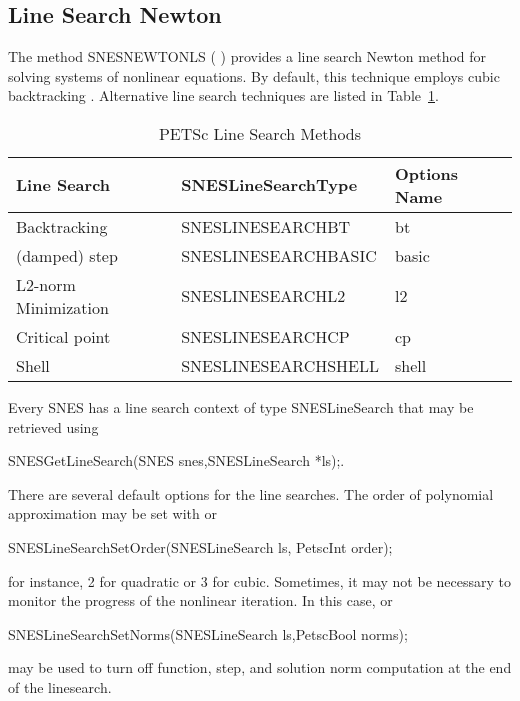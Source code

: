 \subsection{Line Search Newton} 

The method SNESNEWTONLS ( ) provides a line search Newton method for solving systems of
nonlinear equations.  By default, this technique employs cubic backtracking \cite{dennis:83}.  Alternative line search
techniques are listed in Table~\ref{tab_linesearches}.

\begin{table}
\begin{center}
\begin{tabular}{lll}
{\bf Line Search}      &{\bf SNESLineSearchType}& {\bf Options Name} \\
\hline
Backtracking           & SNESLINESEARCHBT       & bt                 \\
(damped) step          & SNESLINESEARCHBASIC    & basic              \\
L2-norm  Minimization  & SNESLINESEARCHL2       & l2                 \\
Critical point         & SNESLINESEARCHCP       & cp                 \\
Shell                  & SNESLINESEARCHSHELL    & shell              \\
\hline
\end{tabular}
\end{center}
\caption{PETSc Line Search Methods}
\label{tab_linesearches}
\end{table}

Every SNES has a line search context of type SNESLineSearch that may be retrieved using
\begin{tabbing}
SNESGetLineSearch(SNES snes,SNESLineSearch *ls);.
\end{tabbing}

There are several default options for the line searches.  The order of polynomial approximation may be set
with  or
\begin{tabbing}
SNESLineSearchSetOrder(SNESLineSearch ls, PetscInt order);
\end{tabbing}
for instance, 2 for quadratic or 3 for cubic. Sometimes, it may not be necessary to monitor the progress of the
nonlinear iteration.  In this case,  or
\begin{tabbing}
SNESLineSearchSetNorms(SNESLineSearch ls,PetscBool norms);
\end{tabbing}
may be used to turn off function, step, and solution norm computation at the end of the linesearch.

